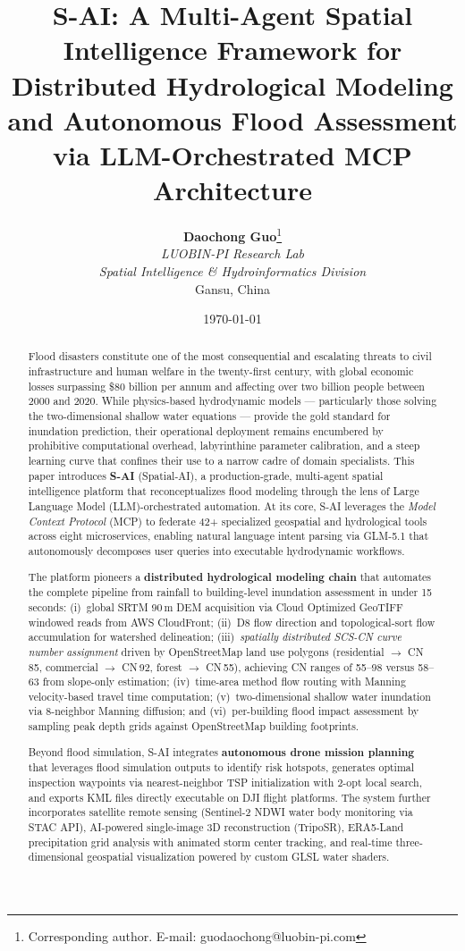 \documentclass[11pt, a4paper]{article}
\title{\textbf{S-AI}: A Multi-Agent Spatial Intelligence Framework for\\Distributed Hydrological Modeling and Autonomous Flood Assessment\\via LLM-Orchestrated MCP Architecture}
\author{
  \textbf{Daochong Guo}\thanks{Corresponding author. E-mail: guodaochong@luobin-pi.com} \\[4pt]
  \textit{LUOBIN-PI Research Lab}\\
  \textit{Spatial Intelligence \& Hydroinformatics Division}\\
  Gansu, China
}
\date{\today}
\begin{document}
\maketitle

\begin{abstract}
Flood disasters constitute one of the most consequential and escalating threats to civil infrastructure and human welfare in the twenty-first century, with global economic losses surpassing \$80 billion per annum and affecting over two billion people between 2000 and 2020. While physics-based hydrodynamic models --- particularly those solving the two-dimensional shallow water equations --- provide the gold standard for inundation prediction, their operational deployment remains encumbered by prohibitive computational overhead, labyrinthine parameter calibration, and a steep learning curve that confines their use to a narrow cadre of domain specialists. This paper introduces \textbf{S-AI} (Spatial-AI), a production-grade, multi-agent spatial intelligence platform that reconceptualizes flood modeling through the lens of Large Language Model (LLM)-orchestrated automation. At its core, S-AI leverages the \emph{Model Context Protocol} (MCP) to federate 42+ specialized geospatial and hydrological tools across eight microservices, enabling natural language intent parsing via GLM-5.1 that autonomously decomposes user queries into executable hydrodynamic workflows.

The platform pioneers a \textbf{distributed hydrological modeling chain} that automates the complete pipeline from rainfall to building-level inundation assessment in under 15 seconds: (i)~global SRTM 90\,m DEM acquisition via Cloud Optimized GeoTIFF windowed reads from AWS CloudFront; (ii)~D8 flow direction and topological-sort flow accumulation for watershed delineation; (iii)~\emph{spatially distributed SCS-CN curve number assignment} driven by OpenStreetMap land use polygons (residential $\to$ CN\,85, commercial $\to$ CN\,92, forest $\to$ CN\,55), achieving CN ranges of 55--98 versus 58--63 from slope-only estimation; (iv)~time-area method flow routing with Manning velocity-based travel time computation; (v)~two-dimensional shallow water inundation via 8-neighbor Manning diffusion; and (vi)~per-building flood impact assessment by sampling peak depth grids against OpenStreetMap building footprints.

Beyond flood simulation, S-AI integrates \textbf{autonomous drone mission planning} that leverages flood simulation outputs to identify risk hotspots, generates optimal inspection waypoints via nearest-neighbor TSP initialization with 2-opt local search, and exports KML files directly executable on DJI flight platforms. The system further incorporates satellite remote sensing (Sentinel-2 NDWI water body monitoring via STAC API), AI-powered single-image 3D reconstruction (TripoSR), ERA5-Land precipitation grid analysis with animated storm center tracking, and real-time three-dimensional geospatial visualization powered by custom GLSL water shaders.


\end{abstract}
\end{document}
